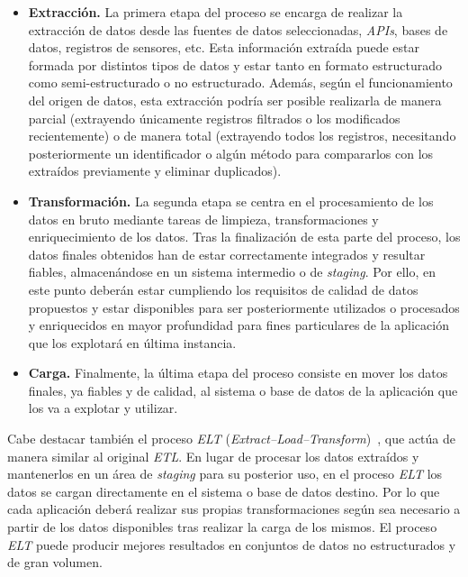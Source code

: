 \begin{itemize}
    \item \textbf{Extracción.} La primera etapa del proceso se encarga de realizar la extracción de datos desde las fuentes de datos seleccionadas, \textit{APIs}, bases de datos, registros de sensores, etc. Esta información extraída puede estar formada por distintos tipos de datos y estar tanto en formato estructurado como semi-estructurado o no estructurado. Además, según el funcionamiento del origen de datos, esta extracción podría ser posible realizarla de manera parcial (extrayendo únicamente registros filtrados o los modificados recientemente) o de manera total (extrayendo todos los registros, necesitando posteriormente un identificador o algún método para compararlos con los extraídos previamente y eliminar duplicados).

    \item \textbf{Transformación.} La segunda etapa se centra en el procesamiento de los datos en bruto mediante tareas de limpieza, transformaciones y enriquecimiento de los datos. Tras la finalización de esta parte del proceso, los datos finales obtenidos han de estar correctamente integrados y resultar fiables, almacenándose en un sistema intermedio o de \textit{staging}. Por ello, en este punto deberán estar cumpliendo los requisitos de calidad de datos propuestos y estar disponibles para ser posteriormente utilizados o procesados y enriquecidos en mayor profundidad para fines particulares de la aplicación que los explotará en última instancia. 

    \item \textbf{Carga.} Finalmente, la última etapa del proceso consiste en mover los datos finales, ya fiables y de calidad, al sistema o base de datos de la aplicación que los va a explotar y utilizar.
\end{itemize}

Cabe destacar también el proceso \textit{ELT} (\textit{Extract--Load--Transform})~\cite{ibmETL}, que actúa de manera similar al original \textit{ETL}. En lugar de procesar los datos extraídos y mantenerlos en un área de \textit{staging} para su posterior uso, en el proceso \textit{ELT} los datos se cargan directamente en el sistema o base de datos destino. Por lo que cada aplicación deberá realizar sus propias transformaciones según sea necesario a partir de los datos disponibles tras realizar la carga de los mismos. El proceso \textit{ELT} puede producir mejores resultados en conjuntos de datos no estructurados y de gran volumen.  

